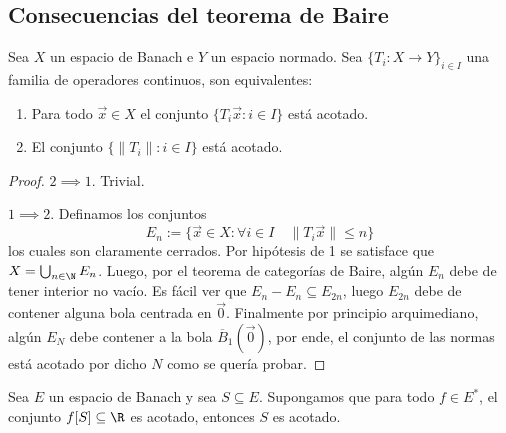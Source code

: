 \documentclass[topologia-analisis.tex]{subfiles}
\begin{document}

\subsection{Consecuencias del teorema de Baire}
\begin{thm}
	Sea $X$ un espacio de Banach e $Y$ un espacio normado.
	Sea $\{T_i \colon X \to Y\}_{i\in I}$ una familia de operadores continuos, son equivalentes:
	\begin{enumerate}
		\item Para todo $\vec x \in X$ el conjunto $\{T_i\vec x : i\in I\}$ está acotado.
		\item El conjunto $\{ \|T_i\| : i\in I\}$ está acotado.
	\end{enumerate}
\end{thm}
\begin{proof}
	$2 \implies 1$. Trivial.
	\par
	$1 \implies 2$. Definamos los conjuntos
	$$ E_n := \{ \vec x \in X : \forall i\in I \quad \|T_i\vec x\| \le n \} $$
	los cuales son claramente cerrados.
	Por hipótesis de 1 se satisface que $X = \bigcup_{n\in\N} E_n$.
	Luego, por el teorema de categorías de Baire, algún $E_n$ debe de tener interior no vacío.
	Es fácil ver que $E_n - E_n \subseteq E_{2n}$, luego $E_{2n}$ debe de contener alguna bola centrada en $\Vec 0$.
	Finalmente por principio arquimediano, algún $E_N$ debe contener a la bola $\overline B_1(\Vec 0)$, por ende, el conjunto de las normas está acotado
	por dicho $N$ como se quería probar.
\end{proof}
\begin{cor}
	Sea $E$ un espacio de Banach y sea $S \subseteq E$.
	Supongamos que para todo $f \in E^*$, el conjunto $f[S] \subseteq \R$ es acotado, entonces $S$ es acotado.
\end{cor}
\end{document}
